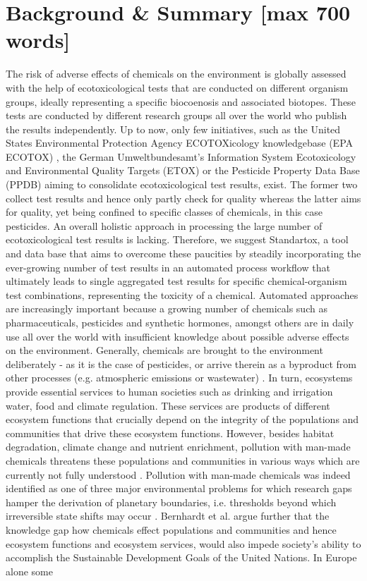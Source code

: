 
\section*{Background \& Summary [max 700 words]}

The risk of adverse effects of chemicals on the environment is globally assessed with the help of ecotoxicological tests that are conducted on different organism groups, ideally representing a specific biocoenosis and associated biotopes. These tests are conducted by different research groups all over the world who publish the results independently. Up to now, only few initiatives, such as the United States Environmental Protection Agency ECOTOXicology knowledgebase (EPA ECOTOX) \citep{elonen_ecotoxicology_2018}, the German Umweltbundesamt's Information System Ecotoxicology and Environmental Quality Targets (ETOX) \citep{umweltbundesamt_etox_2019} or the Pesticide Property Data Base (PPDB) aiming to consolidate ecotoxicological test results, exist. The former two collect test results and hence only partly check for quality whereas the latter aims for quality, yet being confined to specific classes of chemicals, in this case pesticides. An overall holistic approach in processing the large number of ecotoxicological test results is lacking. Therefore, we suggest Standartox, a tool and data base that aims to overcome these paucities by steadily incorporating the ever-growing number of test results in an automated process workflow that ultimately leads to single aggregated test results for specific chemical-organism test combinations, representing the toxicity of a chemical. Automated approaches are increasingly important because a growing number of chemicals such as pharmaceuticals, pesticides and synthetic hormones, amongst others are in daily use all over the world with insufficient knowledge about possible adverse effects on the environment. Generally, chemicals are brought to the environment deliberately - as it is the case of pesticides, or arrive therein as a byproduct from other processes (e.g. atmospheric emissions or wastewater) \citep{schwarzenbach_challenge_2006}. In turn, ecosystems provide essential services to human societies such as drinking and irrigation water, food and climate regulation. These services are products of different ecosystem functions that crucially depend on the integrity of the populations and communities that drive these ecosystem functions. However, besides habitat degradation, climate change and nutrient enrichment, pollution with man-made chemicals threatens these populations and communities in various ways which are currently not fully understood \citep{steffen_anthropocene_2007}. Pollution with man-made chemicals was indeed identified as one of three major environmental problems for which research gaps hamper the derivation of planetary boundaries, i.e. thresholds beyond which irreversible state shifts may occur \citep{steffen_anthropocene_2007}. Bernhardt et al. \citet{bernhardt_synthetic_2017} argue further that the knowledge gap how chemicals effect populations and communities and hence ecosystem functions and ecosystem services, would also impede society's ability to accomplish the Sustainable Development Goals of the United Nations. In Europe alone some 